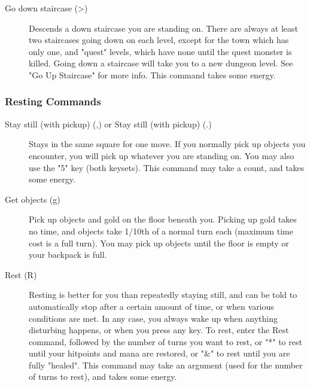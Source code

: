 \begin{description}
    \item[Go down staircase (>)] Descends a down staircase you are
        standing on. There are always at least two staircases going down
        on each level, except for the town which has only one, and
        "quest" levels, which have none until the quest monster is
        killed. Going down a staircase will take you to a new dungeon
        level. See "Go Up Staircase" for more info.  This command takes
        some energy.  \end{description}

\subsubsection{Resting Commands} \begin{description} \item[Stay still
        (with pickup) (,) or Stay still (with pickup) (.)] Stays in the
        same square for one move. If you normally pick up objects you
        encounter, you will pick up whatever you are standing on. You
        may also use the "5" key (both keysets). This command may take a
        count, and takes some energy.

    \item[Get objects (g)] Pick up objects and gold on the floor beneath
        you. Picking up gold takes no time, and objects take 1/10th of a
        normal turn each (maximum time cost is a full turn). You may
        pick up objects until the floor is empty or your backpack is
        full.

    \item[Rest (R)] Resting is better for you than repeatedly staying
        still, and can be told to automatically stop after a certain
        amount of time, or when various conditions are met. In any case,
        you always wake up when anything disturbing happens, or when you
        press any key. To rest, enter the Rest command, followed by the
        number of turns you want to rest, or "*" to rest until your
        hitpoints and mana are restored, or "\&" to rest until you are
        fully "healed". This command may take an argument (used for the
        number of turns to rest), and takes some energy.
\end{description}

